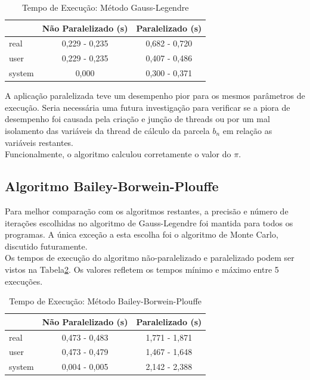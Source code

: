 \documentclass[12pt]{article}
\begin{document}
\begin{table}[h]
	\centering
	\caption{Tempo de Execução: Método Gauss-Legendre}
	\begin{tabular}{|l|c|c|}
		\hline
		{}		& Não Paralelizado (s) & Paralelizado (s)\\
		\hline
		real 	& 0,229 - 0,235	& 0,682 - 0,720 \\
		user 	& 0,229 - 0,235	& 0,407 - 0,486 \\
		system 	& 0,000			& 0,300 - 0,371 \\
		\hline
	\end{tabular}
	\label{tab:table02}
\end{table}

A aplicação paralelizada teve um desempenho pior para os mesmos parâmetros de execução. 
Seria necessária uma futura investigação para verificar se a piora de desempenho foi
causada pela criação e junção de threads ou por um mal isolamento das variáveis
da thread de cálculo da parcela $b_n$ em relação as variáveis restantes.\\

Funcionalmente, o algoritmo calculou corretamente o valor do $\pi$.\\

\subsection{Algoritmo Bailey-Borwein-Plouffe}

Para melhor comparação com os algoritmos restantes, a precisão e número de iterações
escolhidas no algoritmo de Gauss-Legendre foi mantida para todos os programas.
A única exceção a esta escolha foi o algoritmo de Monte Carlo, discutido futuramente.\\
Os tempos de execução do algoritmo não-paralelizado e paralelizado podem ser vistos na
Tabela\ref{tab:table03}. Os valores refletem os tempos mínimo e máximo entre 5 execuções.\\
 
\begin{table}[h]
	\centering
	\caption{Tempo de Execução: Método Bailey-Borwein-Plouffe}
	\begin{tabular}{|l|c|c|}
		\hline
		{}		& Não Paralelizado (s) & Paralelizado (s)\\
		\hline
		real 	& 0,473 - 0,483	& 1,771 - 1,871 \\
		user 	& 0,473 - 0,479	& 1,467 - 1,648 \\
		system 	& 0,004	- 0,005 & 2,142 - 2,388 \\
		\hline
	\end{tabular}
	\label{tab:table03}
\end{table}
\end{document}
